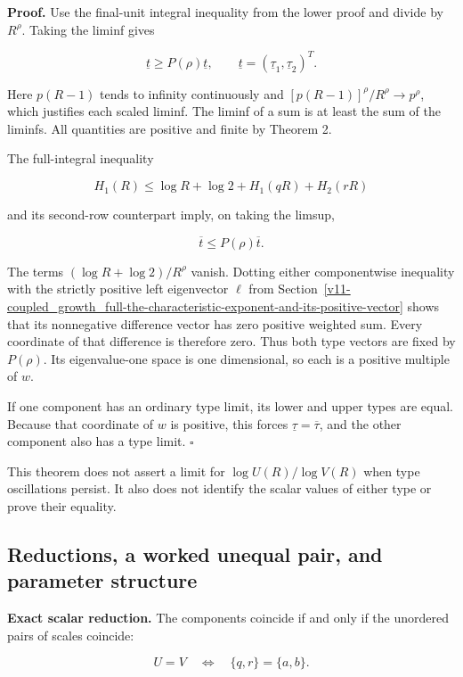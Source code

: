 \textbf{Proof.} Use the final-unit integral inequality from the lower
proof and divide by \(R^\rho\). Taking the liminf gives

\[
\underline t\ge P(\rho)\underline t,
\qquad
\underline t=(\underline\tau_1,\underline\tau_2)^T.
\]

Here \(p(R-1)\) tends to infinity continuously and
\([p(R-1)]^\rho/R^\rho\to p^\rho\), which justifies each scaled liminf.
The liminf of a sum is at least the sum of the liminfs. All quantities
are positive and finite by Theorem 2.

The full-integral inequality

\[
H_1(R)\le\log R+\log2+H_1(qR)+H_2(rR)
\]

and its second-row counterpart imply, on taking the limsup,

\[
\overline t\le P(\rho)\overline t.
\]

The terms \((\log R+\log2)/R^\rho\) vanish. Dotting either componentwise
inequality with the strictly positive left eigenvector \(\ell\) from
Section~\ref{v11-coupled_growth_full-the-characteristic-exponent-and-its-positive-vector} shows that its nonnegative difference vector has zero positive
weighted sum. Every coordinate of that difference is therefore zero.
Thus both type vectors are fixed by \(P(\rho)\). Its eigenvalue-one
space is one dimensional, so each is a positive multiple of \(w\).

If one component has an ordinary type limit, its lower and upper types
are equal. Because that coordinate of \(w\) is positive, this forces
\(\underline\tau=\overline\tau\), and the other component also has a
type limit. \(\square\)

This theorem does not assert a limit for \(\log U(R)/\log V(R)\) when
type oscillations persist. It also does not identify the scalar values
of either type or prove their equality.

\hypertarget{v11-coupled_growth_full-reductions-a-worked-unequal-pair-and-parameter-structure}{%
\subsection{Reductions, a worked unequal pair, and parameter
structure}\label{v11-coupled_growth_full-reductions-a-worked-unequal-pair-and-parameter-structure}}

\textbf{Exact scalar reduction.} The components coincide if and only if
the unordered pairs of scales coincide:

\[
U=V\quad\Longleftrightarrow\quad\{q,r\}=\{a,b\}.
\]

